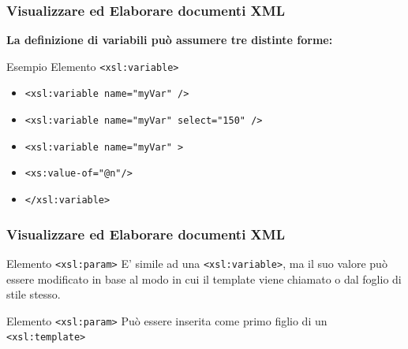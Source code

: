 \begin{frame}
    \frametitle{Visualizzare ed Elaborare documenti XML}
    \addtocounter{nframe}{1}
    
    \textbf{La definizione di variabili può assumere tre distinte forme:}

     \begin{block}{Esempio Elemento \texttt{<xsl:variable>}}
        \begin{itemize}
            \item \texttt{<xsl:variable name="myVar" />}
            \item \texttt{<xsl:variable name="myVar" select="150" />}
            \item \texttt{<xsl:variable name="myVar" >}
            \item[] \texttt{<xs:value-of="@n"/>}
            \item[] \texttt{</xsl:variable>}
        \end{itemize}

     \end{block}
\end{frame}


\begin{frame}
    \frametitle{Visualizzare ed Elaborare documenti XML}
    \addtocounter{nframe}{1}
    

     \begin{block}{Elemento \texttt{<xsl:param>}}
        E' simile ad una \texttt{<xsl:variable>}, ma il suo valore può essere modificato in base al modo in cui il template viene chiamato o dal foglio di stile stesso.
     \end{block}

     \begin{block}{Elemento \texttt{<xsl:param>}}
        Può essere inserita come primo figlio di un \texttt{<xsl:template>}
     \end{block}

\end{frame}


